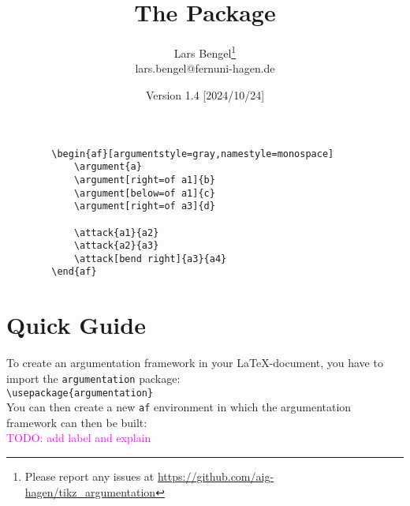 \documentclass[headings=normal]{scrartcl}
\title{The \argumentation Package}
\author{Lars Bengel\footnote{Please report any issues at \url{https://github.com/aig-hagen/tikz_argumentation}}\\\small lars.bengel@fernuni-hagen.de}
\date{Version 1.4 [2024/10/24]}
\newcommand{\todo}[1]{\textcolor{magenta}{TODO: #1}} %
\newcommand{\argumentation}{\texttt{argumentation}\xspace}
\begin{document}
\maketitle

\begin{minipage}{.26\textwidth}
    \centering
        \begin{af}[argumentstyle=gray,namestyle=monospace]
    
        \end{af}
\end{minipage}
\begin{minipage}{.5\textwidth}
    \begin{small}
    \begin{verbatim}
        \begin{af}[argumentstyle=gray,namestyle=monospace]
            \argument{a}
            \argument[right=of a1]{b}
            \argument[below=of a1]{c}
            \argument[right=of a3]{d}
    
            \attack{a1}{a2}
            \attack{a2}{a3}
            \attack[bend right]{a3}{a4}
        \end{af}
    \end{verbatim}
    \end{small}
\end{minipage}


\tableofcontents
\newpage

\section{Quick Guide}\label{sec:quick}

\noindent
To create an argumentation framework in your \LaTeX-document, you have to import the \argumentation package:\\

\vspace{-0.3cm}
\verb|\usepackage{argumentation}|\\

\noindent
You can then create a new \texttt{af} environment in which the argumentation framework can then be built:\\
\todo{add label and explain}
\end{document}
